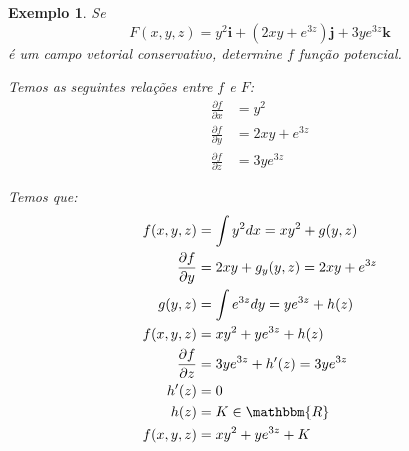 \documentclass{article}
\newcommand{\REAL}{\mathbbm{R}}
\newcommand{\PartialDer}[2] {\frac{\partial #1}{\partial #2}}
\newtheorem{example}{Exemplo}[section]
\begin{document}
        \begin{example}
            Se
            \[
                F(x, y, z) = y^2 \textbf{i} + (2xy + e^{3z}) \textbf{j} + 3ye^{3z} \textbf{k}
            \]
            é um campo vetorial conservativo, determine $f$ função potencial.

            Temos as seguintes relações entre $f$ e $F$:
            \begin{align*}
                \PartialDer{f}{x} &= y^2\\
                \PartialDer{f}{y} &= 2xy + e^{3z}\\
                \PartialDer{f}{z} &= 3ye^{3z}
            \end{align*}

            Temos que:
            \begin{align*}
                f(x, y, z) &= \int y^2 dx = xy^2 + g(y, z)\\
                \PartialDer{f}{y} &= 2xy + g_y (y, z) = 2xy + e^{3z}\\
                g (y, z) &= \int e^{3z} dy = ye^{3z} + h(z)\\
                f(x, y, z) &= xy^2 + ye^{3z} + h(z)\\
                \PartialDer{f}{z} &= 3ye^{3z} + h^\prime(z) = 3ye^{3z}\\
                h^\prime(z) &= 0\\
                h(z) &= K \in \REAL\\
                f(x, y, z) &= xy^2 + ye^{3z} + K\\
            \end{align*}
        \end{example}
\end{document}
